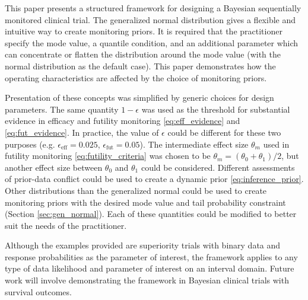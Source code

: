 \documentclass[useAMS,usenatbib,referee]{biom}
\begin{document}
This paper presents a structured framework for designing a Bayesian sequentially monitored clinical trial.
%
The generalized normal distribution gives a flexible and intuitive way to create monitoring priors.
%
It is required that the practitioner specify the mode value, a quantile condition, and an additional parameter which can concentrate or flatten the distribution around the mode value (with the normal distribution as the default case).
%
This paper demonstrates how the operating characteristics are affected by the choice of monitoring priors.

Presentation of these concepts was simplified by generic choices for design parameters.
%
The same quantity $1-\epsilon$ was used as the threshold for substantial evidence in efficacy and futility monitoring \eqref{eq:eff_evidence} and \eqref{eq:fut_evidence}.
%
In practice, the value of $\epsilon$ could be different for these two purposes (e.g. $\epsilon_{\text{eff}}=0.025$, $\epsilon_{\text{fut}}=0.05$).
%
The intermediate effect size $\theta_m$ used in futility monitoring \eqref{eq:futility_criteria} was chosen to be $\theta_m=(\theta_0+\theta_1)/2$, but another effect size between $\theta_0$ and $\theta_1$ could be considered.
%
Different assessments of prior-data conflict could be used to create a dynamic prior \eqref{eq:inference_prior}.
%
Other distributions than the generalized normal could be used to create monitoring priors with the desired mode value and tail probability constraint (Section \ref{sec:gen_normal}).
%
Each of these quantities could be modified to better suit the needs of the practitioner. 

Although the examples provided are superiority trials with binary data and response probabilities as the parameter of interest, the framework applies to any type of data likelihood and parameter of interest on an interval domain.
%
Future work will involve demonstrating the framework in Bayesian clinical trials with survival outcomes.

\end{document}
